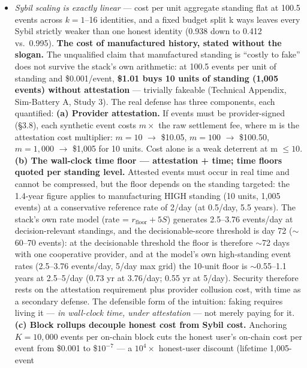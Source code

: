 \documentclass[
]{article}
\begin{document}
\begin{itemize}
  \begin{itemize}
  \item
    \emph{Sybil scaling is exactly linear} --- cost per unit aggregate
    standing flat at 100.5 events across \(k = 1\)--16 identities, and a
    fixed budget split k ways leaves every Sybil strictly weaker than
    one honest identity (0.938 down to 0.412 vs.~0.995). \textbf{The
    cost of manufactured history, stated without the slogan.} The
    unqualified claim that manufactured standing is ``costly to fake''
    does not survive the stack's own arithmetic: at 100.5 events per
    unit of standing and \$0.001/event, \textbf{\$1.01 buys 10 units of
    standing (1,005 events) without attestation} --- trivially fakeable
    (Technical Appendix, Sim-Battery A, Study 3). The real defense has
    three components, each quantified: \textbf{(a) Provider
    attestation.} If events must be provider-signed (§3.8), each
    synthetic event costs \(m\times\) the raw settlement fee, where m is
    the attestation cost multiplier: \(m = 10\) \(\to\) \$10.05,
    \(m = 100\) \(\to\) \$100.50, \(m = 1,000\) \(\to\) \$1,005 for 10
    units. Cost alone is a weak deterrent at m \(\leq 10.\) \textbf{(b)
    The wall-clock time floor --- attestation + time; time floors quoted
    per standing level.} Attested events must occur in real time and
    cannot be compressed, but the floor depends on the standing
    targeted: the 1.4-year figure applies to manufacturing HIGH standing
    (10 units, 1,005 events) at a conservative reference rate of 2/day
    (at 0.5/day, 5.5 years). The stack's own rate model (rate =
    \(r_{\mathrm{floor}} + 5S\)) generates 2.5--3.76 events/day at
    decision-relevant standings, and the decisionable-score threshold is
    day 72 (\(\sim\)60--70 events): at the decisionable threshold the
    floor is therefore \(\sim\)72 days with one cooperative provider,
    and at the model's own high-standing event rates (2.5--3.76
    events/day, 5/day max grid) the 10-unit floor is \(\sim\)0.55--1.1
    years at 2.5--5/day (0.73 yr at 3.76/day; 0.55 yr at 5/day).
    Security therefore rests on the attestation requirement plus
    provider collusion cost, with time as a secondary defense. The
    defensible form of the intuition: faking requires living it ---
    \emph{in wall-clock time, under attestation} --- not merely paying
    for it. \textbf{(c) Block rollups decouple honest cost from Sybil
    cost.} Anchoring \(K = 10,000\) events per on-chain block cuts the
    honest user's on-chain cost per event from \$0.001 to \$\(10^{-7}\)
    --- a \(10^{4}\times\) honest-user discount (lifetime 1,005-event

\end{itemize}
\end{itemize}
\end{document}
